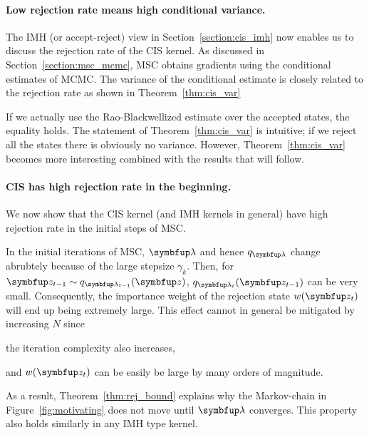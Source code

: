 \paragraph{Low rejection rate means high conditional variance.}
The IMH (or accept-reject) view in Section~\ref{section:cis_imh} now enables us to discuss the rejection rate of the CIS kernel.
As discussed in Section~\ref{section:msc_mcmc}, MSC obtains gradients using the conditional estimates of MCMC.
The variance of the conditional estimate is closely related to the rejection rate as shown in Theorem~\ref{thm:cis_var}
%

%
If we actually use the Rao-Blackwellized estimate over the accepted states, the equality holds.
The statement of Theorem~\ref{thm:cis_var} is intuitive; if we reject all the states there is obviously no variance.
However, Theorem~\ref{thm:cis_var} becomes more interesting combined with the results that will follow.

\paragraph{CIS has high rejection rate in the beginning.}
We now show that the CIS kernel (and IMH kernels in general) have high rejection rate in the initial steps of MSC.
%

%
In the initial iterations of MSC, \(\vlambda\) and hence \(q_{\vlambda}\) change abrubtely because of the large stepsize \(\gamma_k\).
Then, for \(\vz_{t-1} \sim q_{\vlambda_{t-1}}(\vz)\), \(q_{\vlambda_t}(\vz_{t-1})\) can be very small.
Consequently, the importance weight of the rejection state \(w(\vz_t)\) will end up being extremely large.
This effect cannot in general be mitigated by increasing \(N\) since
\begin{enumerate*}[label=(\roman*)]
  \item the iteration complexity also increases,
  \item and \(w(\vz_t)\) can be easily be large by many orders of magnitude.
\end{enumerate*}
As a result, Theorem~\ref{thm:rej_bound} explains why the Markov-chain in Figure~\ref{fig:motivating} does not move until \(\vlambda\) converges.
This property also holds similarly in any IMH type kernel.

